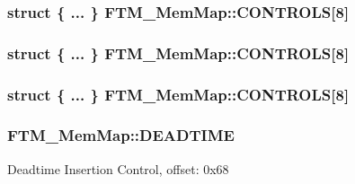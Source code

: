 \subsubsection[{\texorpdfstring{C\+O\+N\+T\+R\+O\+LS}{CONTROLS}}]{\setlength{\rightskip}{0pt plus 5cm}struct \{ ... \}   F\+T\+M\+\_\+\+Mem\+Map\+::\+C\+O\+N\+T\+R\+O\+LS\mbox{[}8\mbox{]}}\hypertarget{struct_f_t_m___mem_map_a0fde0c82acda7267eee92ff00cff9057}{}\label{struct_f_t_m___mem_map_a0fde0c82acda7267eee92ff00cff9057}
\subsubsection[{\texorpdfstring{C\+O\+N\+T\+R\+O\+LS}{CONTROLS}}]{\setlength{\rightskip}{0pt plus 5cm}struct \{ ... \}   F\+T\+M\+\_\+\+Mem\+Map\+::\+C\+O\+N\+T\+R\+O\+LS\mbox{[}8\mbox{]}}\hypertarget{struct_f_t_m___mem_map_a1225196b7d1869e62a82af6cec93638c}{}\label{struct_f_t_m___mem_map_a1225196b7d1869e62a82af6cec93638c}
\subsubsection[{\texorpdfstring{C\+O\+N\+T\+R\+O\+LS}{CONTROLS}}]{\setlength{\rightskip}{0pt plus 5cm}struct \{ ... \}   F\+T\+M\+\_\+\+Mem\+Map\+::\+C\+O\+N\+T\+R\+O\+LS\mbox{[}8\mbox{]}}\hypertarget{struct_f_t_m___mem_map_adfcb86466847710fadcfc4f7c9fd8cb3}{}\label{struct_f_t_m___mem_map_adfcb86466847710fadcfc4f7c9fd8cb3}
\subsubsection[{\texorpdfstring{D\+E\+A\+D\+T\+I\+ME}{DEADTIME}}]{ F\+T\+M\+\_\+\+Mem\+Map\+::\+D\+E\+A\+D\+T\+I\+ME}\hypertarget{struct_f_t_m___mem_map_a7a7e6e572834de5c95fc5279659e582c}{}\label{struct_f_t_m___mem_map_a7a7e6e572834de5c95fc5279659e582c}
Deadtime Insertion Control, offset\+: 0x68 


